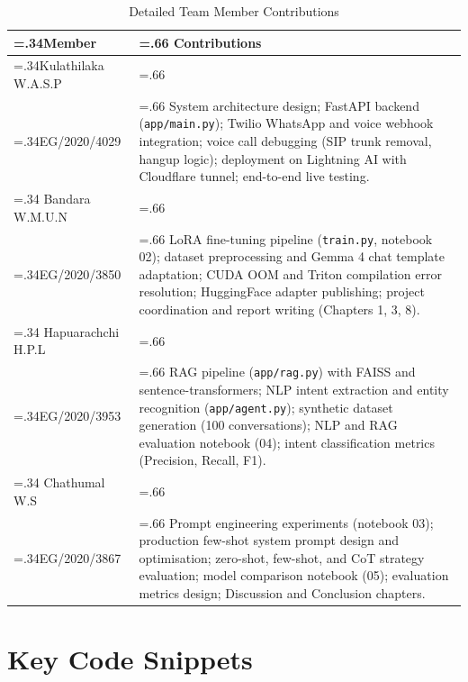 \documentclass[12pt,a4paper]{report}
\begin{document}
\begin{table}[H]
    \caption{Detailed Team Member Contributions}
    \label{tab:contributions}
    \centering
    \begin{tabularx}{\columnwidth}{>{\hsize=.34\hsize}X >{\hsize=.66\hsize}X}
        \toprule
        \textbf{Member} & \textbf{Contributions} \\
        \midrule
        Kulathilaka W.A.S.P\\EG/2020/4029 &
        System architecture design; FastAPI backend (\texttt{app/main.py}); Twilio WhatsApp and voice webhook integration; voice call debugging (SIP trunk removal, hangup logic); deployment on Lightning AI with Cloudflare tunnel; end-to-end live testing. \\
        \midrule
        Bandara W.M.U.N\\EG/2020/3850 &
        LoRA fine-tuning pipeline (\texttt{train.py}, notebook 02); dataset preprocessing and Gemma 4 chat template adaptation; CUDA OOM and Triton compilation error resolution; HuggingFace adapter publishing; project coordination and report writing (Chapters 1, 3, 8). \\
        \midrule
        Hapuarachchi H.P.L\\EG/2020/3953 &
        RAG pipeline (\texttt{app/rag.py}) with FAISS and sentence-transformers; NLP intent extraction and entity recognition (\texttt{app/agent.py}); synthetic dataset generation (100 conversations); NLP and RAG evaluation notebook (04); intent classification metrics (Precision, Recall, F1). \\
        \midrule
        Chathumal W.S\\EG/2020/3867 &
        Prompt engineering experiments (notebook 03); production few-shot system prompt design and optimisation; zero-shot, few-shot, and CoT strategy evaluation; model comparison notebook (05); evaluation metrics design; Discussion and Conclusion chapters. \\
        \bottomrule
    \end{tabularx}
\end{table}

\chapter{Key Code Snippets}
\end{document}
